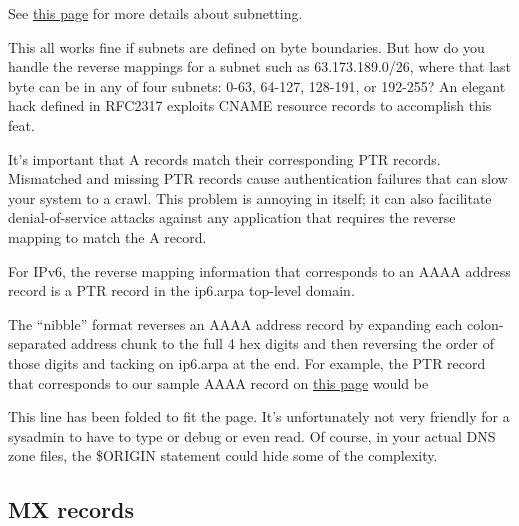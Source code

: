 \leavevmode\hypertarget{part0024_split_026.htmlux5cux23_idContainer951}{}%
See
\protect\hyperlink{part0021_split_017.htmlux5cux23_idTextAnchor648}{this
page} for more details about subnetting.

This all works fine if subnets are defined on byte boundaries. But how
do you handle the reverse mappings for a subnet such as 63.173.189.0/26,
where that last byte can be in any of four subnets: 0-63, 64-127,
128-191, or 192-255? An elegant hack defined in RFC2317 exploits CNAME
resource records to accomplish this feat.

It's important that A records match their corresponding PTR records.
Mismatched and missing PTR records cause authentication failures that
can slow your system to a crawl. This problem is annoying in itself; it
can also facilitate denial-of-service attacks against any application
that requires the reverse mapping to match the A record.

\protect\hypertarget{part0024_split_026.htmlux5cux23_idIndexMarker2088}{}{}\protect\hypertarget{part0024_split_026.htmlux5cux23_idIndexMarker2089}{}{}For
IPv6, the
\protect\hypertarget{part0024_split_026.htmlux5cux23_idIndexMarker2090}{}{}reverse
mapping information that corresponds to an AAAA address record is a PTR
record in the ip6.arpa top-level domain.

The ``nibble'' format reverses an AAAA address record by expanding each
colon-separated address chunk to the full 4 hex digits and then
reversing the order of those digits and tacking on
\protect\hypertarget{part0024_split_026.htmlux5cux23_idIndexMarker2091}{}{}\protect\hypertarget{part0024_split_026.htmlux5cux23_idIndexMarker2092}{}{}ip6.arpa
at the end. For example, the PTR record that corresponds to our sample
AAAA record on
\protect\hyperlink{part0024_split_025.htmlux5cux23_idTextAnchor877}{this
page} would be


This line has been folded to fit the page. It's unfortunately not very
friendly for a sysadmin to have to type or debug or even read. Of
course, in your actual DNS zone files, the {\$ORIGIN} statement could
hide some of the complexity.

\protect\hypertarget{part0024_split_027.html}{}{}

\hypertarget{part0024_split_027.htmlux5cux23_idContainer1069}{}
\hypertarget{part0024_split_027.htmlux5cux23calibre_pb_26}{%
\subsection[MX
records]{\texorpdfstring{\protect\hypertarget{part0024_split_027.htmlux5cux23_idTextAnchor881}{}{}\protect\hypertarget{part0024_split_027.htmlux5cux23_idIndexMarker2093}{}{}\protect\hypertarget{part0024_split_027.htmlux5cux23_idTextAnchor882}{}{}MX
records}{MX records}}\label{part0024_split_027.htmlux5cux23calibre_pb_26}}

